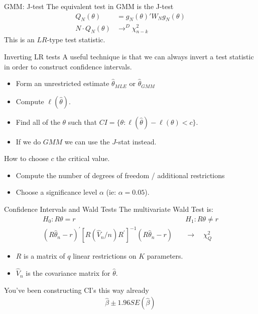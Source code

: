 \documentclass[aspectratio=169]{beamer}
\begin{document}
\begin{frame}{GMM: J-test}
The equivalent test in GMM is the \alert{J-test}
\begin{align*}
Q_N(\theta)&=g_N(\theta)' W_N  g_N(\theta) \\
N \cdot Q_N(\theta) &\rightarrow^D \chi^2_{n-k}
\end{align*}
This is an $LR$-type test statistic.
\end{frame}


\begin{frame}{Inverting LR tests}
A useful technique is that we can always \alert{invert} a test statistic in order to construct confidence intervals.
\begin{itemize}
\item Form an unrestricted estimate $\widehat{\theta}_{MLE}$ or $\widehat{\theta}_{GMM}$
\item Compute $\ell(\widehat{\theta})$.
\item Find all of the $\theta$ such that  $CI=\{\theta: \ell(\widehat{\theta}) -  \ell(\theta) < c \}$.
\item If we do $GMM$ we can use the $J$-stat instead.
\end{itemize}
How to choose $c$ the \alert{critical value}.
\begin{itemize}
\item Compute the number of degrees of freedom / additional restrictions
\item Choose a significance level $\alpha$ (ie: $\alpha=0.05$).
\end{itemize}
\end{frame}


\begin{frame}{Confidence Intervals and Wald Tests}
The multivariate Wald Test is:
\begin{align*}
H_{0}: R \theta=r \quad &
H_{1}: R \theta \neq r\\
\left(R \hat{\theta}_{n}-r\right)^{\prime}\left[R\left(\hat{V}_{n} / n\right) R^{\prime}\right]^{-1}\left(R \hat{\theta}_{n}-r\right) \quad &\rightarrow \quad \chi_{Q}^{2}
\end{align*}
\begin{itemize}
\item $R$ is a matrix of $q$ linear restrictions on $K$ parameters.
\item $\hat{V}_n$ is the covariance matrix for $\widehat{\theta}$.
\end{itemize}
You've been constructing CI's this way already
\begin{align*}
\widehat{\beta} \pm 1.96 SE(\widehat{\beta})
\end{align*}
\end{frame}
\end{document}
